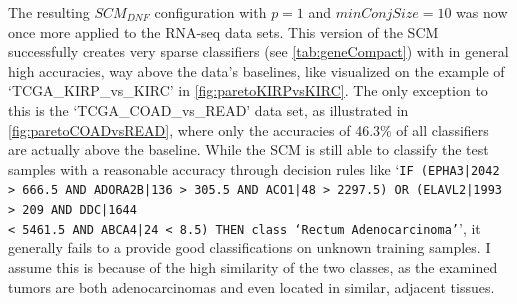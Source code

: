 The resulting \(SCM_{DNF}\) configuration with \(p=1\) and \(minConjSize=10\) was now once more applied to the RNA-seq data sets.
This version of the SCM successfully creates very sparse classifiers (see \autoref{tab:geneCompact}) with in general high accuracies, way above the data's baselines, like visualized on
the example of `TCGA\_KIRP\_vs\_KIRC' in \autoref{fig:paretoKIRPvsKIRC}.
The only exception to this is the `TCGA\_COAD\_vs\_READ' data set, as illustrated in \autoref{fig:paretoCOADvsREAD}, where only the accuracies of 46.3\% of all
classifiers are actually above the baseline.
While the SCM is still able to classify the test samples with a reasonable accuracy through decision rules like
`\texttt{IF (EPHA3|2042 > 666.5 AND ADORA2B|136 > 305.5 AND ACO1|48 > 2297.5) OR (ELAVL2|1993 > 209 AND DDC|1644\\< 5461.5 AND ABCA4|24 < 8.5) THEN class `Rectum Adenocarcinoma'}',
it generally fails to a provide good classifications on unknown training samples.
I assume this is because of the high similarity of the two classes, as the examined tumors are both adenocarcinomas
and even located in similar, adjacent tissues.

